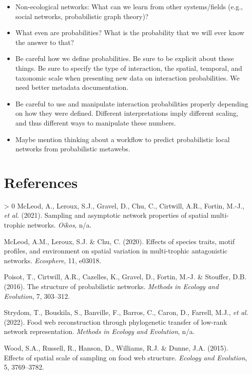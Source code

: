 \documentclass[10pt,oneside]{article}
\newlength{\cslhangindent}
\newenvironment{CSLReferences}[3] %
 {%
  \setlength{\parindent}{0pt}
  \ifodd #1 \everypar{\setlength{\hangindent}{\cslhangindent}}\ignorespaces\fi
  \ifnum #2 > 0
  \setlength{\parskip}{#2\baselineskip}
  \fi
 }%
 {}
\begin{document}
\begin{itemize}
\tightlist
\item
  Non-ecological networks: What can we learn from other systems/fields
  (e.g., social networks, probabilistic graph theory)?
\item
  What even are probabilities? What is the probability that we will ever
  know the answer to that?
\item
  Be careful how we define probabilities. Be sure to be explicit about
  these things. Be sure to specify the type of interaction, the spatial,
  temporal, and taxonomic scale when presenting new data on interaction
  probabilities. We need better metadata documentation.
\item
  Be careful to use and manipulate interaction probabilities properly
  depending on how they were defined. Different interpretations imply
  different scaling, and thus different ways to manipulate these
  numbers.
\item
  Maybe mention thinking about a workflow to predict probabilistic local
  networks from probabilistic metawebs.
\end{itemize}

\hypertarget{references}{%
\section*{References}\label{references}}

\hypertarget{refs}{}
\begin{CSLReferences}{1}{0}
\leavevmode\hypertarget{ref-McLeod2021SamAsy}{}%
McLeod, A., Leroux, S.J., Gravel, D., Chu, C., Cirtwill, A.R., Fortin,
M.-J., \emph{et al.} (2021). Sampling and asymptotic network properties
of spatial multi-trophic networks. \emph{Oikos}, n/a.

\leavevmode\hypertarget{ref-McLeod2020EffSpe}{}%
McLeod, A.M., Leroux, S.J. \& Chu, C. (2020). Effects of species traits,
motif profiles, and environment on spatial variation in multi-trophic
antagonistic networks. \emph{Ecosphere}, 11, e03018.

\leavevmode\hypertarget{ref-Poisot2016StrProa}{}%
Poisot, T., Cirtwill, A.R., Cazelles, K., Gravel, D., Fortin, M.-J. \&
Stouffer, D.B. (2016). The structure of probabilistic networks.
\emph{Methods in Ecology and Evolution}, 7, 303--312.

\leavevmode\hypertarget{ref-Strydom2022FooWeb}{}%
Strydom, T., Bouskila, S., Banville, F., Barros, C., Caron, D., Farrell,
M.J., \emph{et al.} (2022). Food web reconstruction through phylogenetic
transfer of low-rank network representation. \emph{Methods in Ecology
and Evolution}, n/a.

\leavevmode\hypertarget{ref-Wood2015EffSpa}{}%
Wood, S.A., Russell, R., Hanson, D., Williams, R.J. \& Dunne, J.A.
(2015). Effects of spatial scale of sampling on food web structure.
\emph{Ecology and Evolution}, 5, 3769--3782.

\end{CSLReferences}
\end{document}
